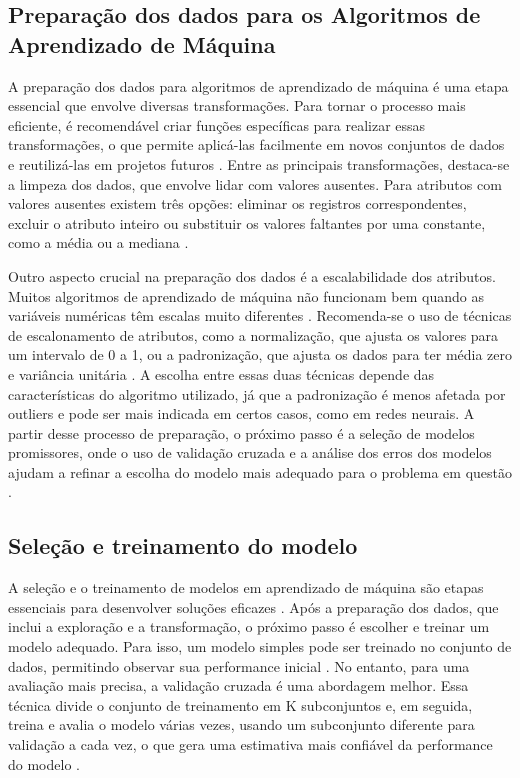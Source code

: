 \subsection{Preparação dos dados para os Algoritmos de Aprendizado de Máquina}
A preparação dos dados para algoritmos de aprendizado de máquina é uma etapa essencial que envolve diversas transformações. Para tornar o processo mais eficiente, é recomendável criar funções específicas para realizar essas transformações, o que permite aplicá-las facilmente em novos conjuntos de dados e reutilizá-las em projetos futuros \cite{geron2017}. Entre as principais transformações, destaca-se a limpeza dos dados, que envolve lidar com valores ausentes. Para atributos com valores ausentes existem três opções: eliminar os registros correspondentes, excluir o atributo inteiro ou substituir os valores faltantes por uma constante, como a média ou a mediana \cite{geron2017}. 

Outro aspecto crucial na preparação dos dados é a escalabilidade dos atributos. Muitos algoritmos de aprendizado de máquina não funcionam bem quando as variáveis numéricas têm escalas muito diferentes \cite{geron2017}. Recomenda-se o uso de técnicas de escalonamento de atributos, como a normalização, que ajusta os valores para um intervalo de 0 a 1, ou a padronização, que ajusta os dados para ter média zero e variância unitária \cite{geron2017}. A escolha entre essas duas técnicas depende das características do algoritmo utilizado, já que a padronização é menos afetada por outliers e pode ser mais indicada em certos casos, como em redes neurais. A partir desse processo de preparação, o próximo passo é a seleção de modelos promissores, onde o uso de validação cruzada e a análise dos erros dos modelos ajudam a refinar a escolha do modelo mais adequado para o problema em questão \cite{geron2017}.

\subsection{Seleção e treinamento do modelo}
A seleção e o treinamento de modelos em aprendizado de máquina são etapas essenciais para desenvolver soluções eficazes \cite{geron2017}. Após a preparação dos dados, que inclui a exploração e a transformação, o próximo passo é escolher e treinar um modelo adequado. Para isso, um modelo simples pode ser treinado no conjunto de dados, permitindo observar sua performance inicial \cite{geron2017}. No entanto, para uma avaliação mais precisa, a validação cruzada é uma abordagem melhor. Essa técnica divide o conjunto de treinamento em K subconjuntos e, em seguida, treina e avalia o modelo várias vezes, usando um subconjunto diferente para validação a cada vez, o que gera uma estimativa mais confiável da performance do modelo \cite{geron2017}.

